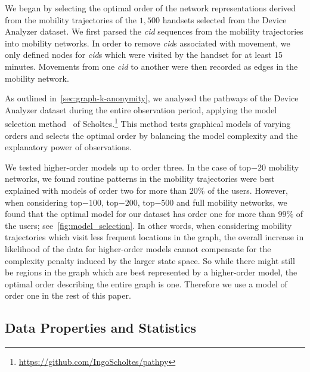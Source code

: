We began by selecting the optimal order of the network representations derived from the mobility trajectories of the $1,500$ handsets selected from the Device Analyzer dataset.
We first parsed the \emph{cid} sequences from the mobility trajectories into mobility networks.
In order to remove \emph{cid}s associated with movement, we only defined nodes for \emph{cid}s which were visited by the handset for at least 15 minutes.
Movements from one \emph{cid} to another were then recorded as edges in the mobility network.

As outlined in~\cref{sec:graph-k-anonymity}, we analysed the pathways of the Device Analyzer dataset during the entire observation period, applying the model selection method~\cite{scholtes2017network} of Scholtes.\footnote{\url{https://github.com/IngoScholtes/pathpy}}
This method tests graphical models of varying orders and selects the optimal order by balancing the model complexity and the explanatory power of observations.

We tested higher-order models up to order three. In the case of top$-20$ mobility networks, we found routine patterns in the mobility trajectories were best explained with models of order two for more than 20$\%$ of the users. However, when considering top$-100$, top$-200$, top$-500$ and full mobility networks, we found that the optimal model for our dataset has order one for more than $ 99\% $ of the users; see~\cref{fig:model_selection}. In other words, when considering mobility trajectories which visit less frequent locations in the graph, the overall increase in likelihood of the data for higher-order models cannot compensate for the complexity penalty induced by the larger state space. So while there might still be regions in the graph which are best represented by a higher-order model, the optimal order describing the entire graph is one. Therefore we use a model of order one in the rest of this paper.

\subsection{Data Properties and Statistics} \label{sec:data-stats}

